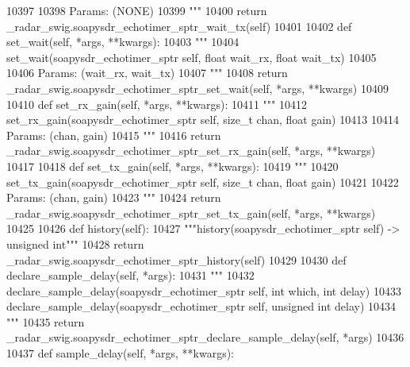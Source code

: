 \begin{DoxyCode}
{{{{{{{{{{{{{{{{{{{{{{{{{{{{{{{{{10397 \textcolor{stringliteral}{}
10398 \textcolor{stringliteral}{        Params: (NONE)}
10399 \textcolor{stringliteral}{        """}
10400         \textcolor{keywordflow}{return} \_radar\_swig.soapysdr\_echotimer\_sptr\_wait\_tx(self)
10401 
10402     \textcolor{keyword}{def }set_wait(self, *args, **kwargs):
10403         \textcolor{stringliteral}{"""}
10404 \textcolor{stringliteral}{        set\_wait(soapysdr\_echotimer\_sptr self, float wait\_rx, float wait\_tx)}
10405 \textcolor{stringliteral}{}
10406 \textcolor{stringliteral}{        Params: (wait\_rx, wait\_tx)}
10407 \textcolor{stringliteral}{        """}
10408         \textcolor{keywordflow}{return} \_radar\_swig.soapysdr\_echotimer\_sptr\_set\_wait(self, *args, **kwargs)
10409 
10410     \textcolor{keyword}{def }set_rx_gain(self, *args, **kwargs):
10411         \textcolor{stringliteral}{"""}
10412 \textcolor{stringliteral}{        set\_rx\_gain(soapysdr\_echotimer\_sptr self, size\_t chan, float gain)}
10413 \textcolor{stringliteral}{}
10414 \textcolor{stringliteral}{        Params: (chan, gain)}
10415 \textcolor{stringliteral}{        """}
10416         \textcolor{keywordflow}{return} \_radar\_swig.soapysdr\_echotimer\_sptr\_set\_rx\_gain(self, *args, **kwargs)
10417 
10418     \textcolor{keyword}{def }set_tx_gain(self, *args, **kwargs):
10419         \textcolor{stringliteral}{"""}
10420 \textcolor{stringliteral}{        set\_tx\_gain(soapysdr\_echotimer\_sptr self, size\_t chan, float gain)}
10421 \textcolor{stringliteral}{}
10422 \textcolor{stringliteral}{        Params: (chan, gain)}
10423 \textcolor{stringliteral}{        """}
10424         \textcolor{keywordflow}{return} \_radar\_swig.soapysdr\_echotimer\_sptr\_set\_tx\_gain(self, *args, **kwargs)
10425 
10426     \textcolor{keyword}{def }history(self):
10427         \textcolor{stringliteral}{"""history(soapysdr\_echotimer\_sptr self) -> unsigned int"""}
10428         \textcolor{keywordflow}{return} \_radar\_swig.soapysdr\_echotimer\_sptr\_history(self)
10429 
10430     \textcolor{keyword}{def }declare_sample_delay(self, *args):
10431         \textcolor{stringliteral}{"""}
10432 \textcolor{stringliteral}{        declare\_sample\_delay(soapysdr\_echotimer\_sptr self, int which, int delay)}
10433 \textcolor{stringliteral}{        declare\_sample\_delay(soapysdr\_echotimer\_sptr self, unsigned int delay)}
10434 \textcolor{stringliteral}{        """}
10435         \textcolor{keywordflow}{return} \_radar\_swig.soapysdr\_echotimer\_sptr\_declare\_sample\_delay(self, *args)
10436 
10437     \textcolor{keyword}{def }sample_delay(self, *args, **kwargs):
}}}}}}}}}}}}}}}}}}}}}}}}}}}}}}}}}
\end{DoxyCode}
